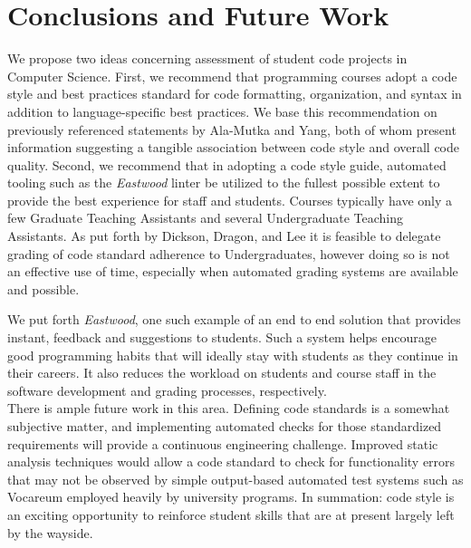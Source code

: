 \documentclass[sigconf]{acmart}
\begin{document}
\section{Conclusions and Future Work}

We propose two ideas concerning assessment of student code projects in Computer Science.
First, we recommend that programming courses adopt a code style and best practices
standard for code formatting, organization, and syntax in addition to language-specific
best practices. We base this recommendation on previously referenced statements by
Ala-Mutka and Yang, both of whom present information suggesting a tangible association
between code style and overall code quality. Second, we recommend that in adopting a
code style guide, automated tooling such as the \textit{Eastwood} linter be utilized to
the fullest possible extent to provide the best experience for staff and students.
Courses typically have only a few Graduate Teaching Assistants and several Undergraduate
Teaching Assistants. As put forth by Dickson, Dragon, and Lee
\cite{10.1145/3017680.3017725} it is feasible to delegate grading of code standard
adherence to Undergraduates, however doing so is not an effective use of time,
especially when automated grading systems are available and possible.

We put forth \textit{Eastwood}, one such example of an end to end solution that provides
instant, feedback and suggestions to students. Such a system helps encourage good
programming habits that will ideally stay with students as they continue in their
careers. It also reduces the workload on students and course staff in the software
development and grading processes, respectively.
\\

There is ample future work in this area. Defining code standards is a somewhat
subjective matter, and implementing automated checks for those standardized
requirements will provide a continuous engineering challenge. Improved static analysis
techniques would allow a code standard to check for functionality errors that may not be
observed by simple output-based automated test systems such as Vocareum employed heavily
by university programs. In summation: code style is an exciting opportunity to reinforce
student skills that are at present largely left by the wayside.
\\



\end{document}
